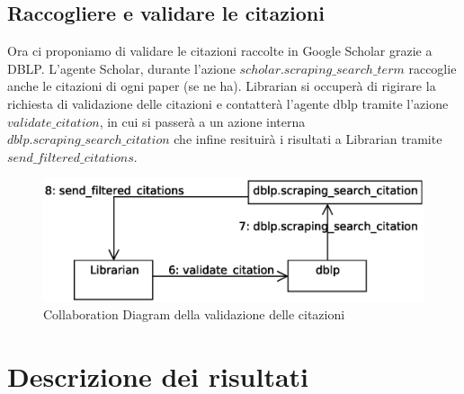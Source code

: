 \documentclass[12pt]{article}
\begin{document}
\subsection{Raccogliere e validare le citazioni}
Ora ci proponiamo di validare le citazioni raccolte in Google Scholar grazie a DBLP. L'agente Scholar, durante l'azione $scholar.scraping\_search\_term$ raccoglie anche le citazioni di ogni paper (se ne ha). Librarian si occuper\`a di rigirare la richiesta di validazione delle citazioni e contatter\`a l'agente dblp tramite l'azione $validate\_citation$, in cui si passer\`a a un azione interna $dblp.scraping\_search\_citation$ che infine resituir\`a i risultati a Librarian tramite $send\_filtered\_citations$.
\begin{figure}[htbp]
\centering
\includegraphics[width=\textwidth]{search_citation.eps}
\caption{Collaboration Diagram della validazione delle citazioni}
\end{figure}
\newpage


\section{Descrizione dei risultati}
\end{document}
